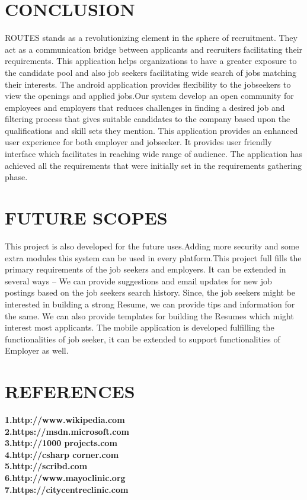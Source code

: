 \documentclass[12pt,a4paper,final]{extreport}
\begin{document}
\chapter{CONCLUSION}
\hspace{01.5cm}ROUTES stands as a revolutionizing element in the sphere of recruitment. They act as a  
communication bridge between applicants and recruiters facilitating their requirements. This  
application helps organizations to have a greater exposure to the candidate pool and also job  
seekers facilitating wide search of jobs matching their interests. The android application provides  
flexibility to the jobseekers to view the openings and applied jobs.Our system develop an open community for employees and employers that reduces challenges in finding a desired  job   and filtering process that gives suitable candidates to the company based upon the qualifications and skill sets they mention. This application provides an enhanced user experience for both employer and jobseeker. It  
provides user friendly interface which facilitates in reaching wide range of audience.  
The application has achieved all the requirements that were initially set in the requirements  
gathering phase. 
\chapter{FUTURE SCOPES}
\hspace{01.5cm}This project is also developed for the future uses.Adding more security and some extra modules this system can be used in every platform.This project full fills the primary requirements of the job seekers and employers. It can be extended  
in several ways – We can provide suggestions and email updates for new job postings based  
on the job seekers search history. Since, the job seekers might be interested in building a strong  
Resume, we can provide tips and information for the same. We can also provide templates for  
building the Resumes which might interest most applicants. The mobile application is developed  
fulfilling the functionalities of job seeker, it can be extended to support functionalities of Employer  
as well.
\chapter{REFERENCES}
\textbf{1.http://www.wikipedia.com}\\
\textbf{2.https://msdn.microsoft.com}\\
\textbf{3.http://1000 projects.com}\\
\textbf{4.http://csharp corner.com}\\
\textbf{5.http://scribd.com}\\
\textbf{6.http://www.mayoclinic.org}\\
\textbf{7.https://citycentreclinic.com}\\
\end{document}
